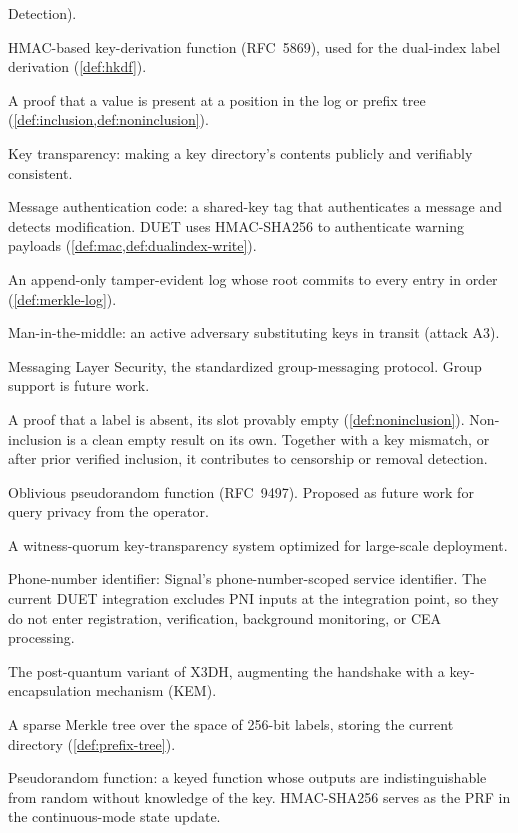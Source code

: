 \begin{description}
  Detection).
\item[HKDF] HMAC-based key-derivation function (RFC~5869), used for the dual-index label derivation
  (\cref{def:hkdf}).
\item[Inclusion proof] A proof that a value is present at a position in the log or prefix tree
  (\cref{def:inclusion,def:noninclusion}).
\item[KT] Key transparency: making a key directory's contents publicly and verifiably consistent.
\item[MAC] Message authentication code: a shared-key tag that authenticates a message and detects
  modification. DUET uses HMAC-SHA256 to authenticate warning payloads
  (\cref{def:mac,def:dualindex-write}).
\item[Merkle log] An append-only tamper-evident log whose root commits to every entry in order
  (\cref{def:merkle-log}).
\item[MitM] Man-in-the-middle: an active adversary substituting keys in transit (attack A3).
\item[MLS] Messaging Layer Security, the standardized group-messaging protocol. Group support is
  future work.
\item[Non-inclusion proof] A proof that a label is absent, its slot provably empty
  (\cref{def:noninclusion}). Non-inclusion is a clean empty result on its own. Together with a key
  mismatch, or after prior verified inclusion, it contributes to censorship or removal detection.
\item[OPRF] Oblivious pseudorandom function (RFC~9497). Proposed as future work for query privacy
  from the operator.
\item[Parakeet] A witness-quorum key-transparency system optimized for large-scale deployment.
\item[PNI] Phone-number identifier: Signal's phone-number-scoped service identifier. The current DUET
  integration excludes PNI inputs at the integration point, so they do not enter registration,
  verification, background monitoring, or CEA processing.
\item[PQXDH] The post-quantum variant of X3DH, augmenting the handshake with a key-encapsulation mechanism (KEM).
\item[Prefix tree] A sparse Merkle tree over the space of 256-bit labels, storing the current
  directory (\cref{def:prefix-tree}).
\item[PRF] Pseudorandom function: a keyed function whose outputs are indistinguishable from random
  without knowledge of the key. HMAC-SHA256 serves as the PRF in the continuous-mode state update.

\end{description}
